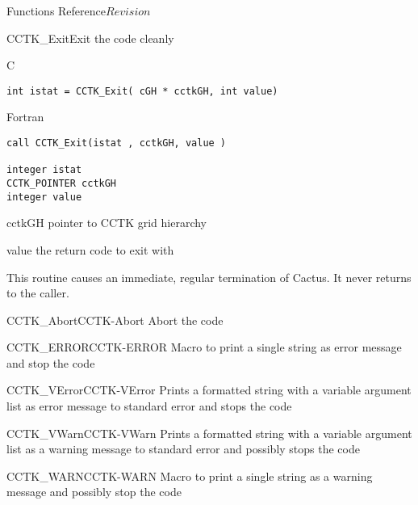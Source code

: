 \begin{cactuspart}{ Functions Reference}{}{$Revision$}
\begin{FunctionDescription}{CCTK\_Exit}{Exit the code cleanly}
\label{CCTK-Exit}
\begin{SynopsisSection}
\begin{Synopsis}{C}
\begin{verbatim}int istat = CCTK_Exit( cGH * cctkGH, int value)\end{verbatim}
\end{Synopsis}
\begin{Synopsis}{Fortran}
\begin{verbatim}call CCTK_Exit(istat , cctkGH, value )

integer istat
CCTK_POINTER cctkGH
integer value \end{verbatim}
\end{Synopsis}
\end{SynopsisSection}
\begin{ParameterSection}
\begin{Parameter}{cctkGH}
pointer to CCTK grid hierarchy
\end{Parameter}
\begin{Parameter}{value}
the return code to exit with
\end{Parameter}
\end{ParameterSection}
\begin{Discussion}
This routine causes an immediate, regular termination of Cactus.
It never returns to the caller.
\end{Discussion}
\begin{SeeAlsoSection}
\begin{SeeAlso2}{CCTK\_Abort}{CCTK-Abort}
Abort the code
\end{SeeAlso2}
\begin{SeeAlso2}{CCTK\_ERROR}{CCTK-ERROR}
Macro to print a single string as error message and stop the code
\end{SeeAlso2}
\begin{SeeAlso2}{CCTK\_VError}{CCTK-VError}
Prints a formatted string with a variable argument list as error
message to standard error and stops the code
\end{SeeAlso2}
\begin{SeeAlso2}{CCTK\_VWarn}{CCTK-VWarn}
Prints a formatted string with a variable argument list as a warning
message to standard error and possibly stops the code
\end{SeeAlso2}
\begin{SeeAlso2}{CCTK\_WARN}{CCTK-WARN}
Macro to print a single string as a warning message and possibly stop the code
\end{SeeAlso2}
\end{SeeAlsoSection}
\end{FunctionDescription}





\end{cactuspart}
